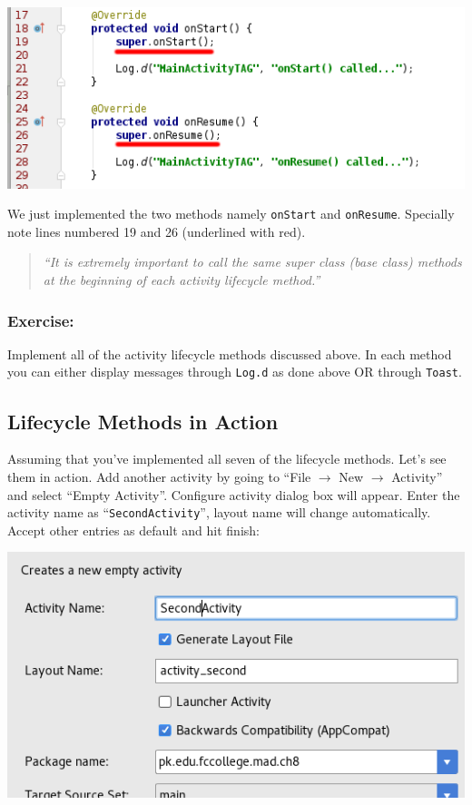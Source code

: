 \begin{center}
	\includegraphics[scale=0.4]{chapters/ch08/images/2}
\end{center}

We just implemented the two methods namely \texttt{onStart} and \texttt{onResume}. Specially note lines numbered 19 and 26 (underlined with red). 

\begin{quote}
	\textit{``It is extremely important to call the same super class (base class) methods at the beginning of each activity lifecycle method.''}
\end{quote}

\subsubsection{Exercise:}
Implement all of the activity lifecycle methods discussed above. In each method you can either display messages through \texttt{Log.d} as done above OR through \texttt{Toast}.

\subsection{Lifecycle Methods in Action}
Assuming that you've implemented all seven of the lifecycle methods. Let's see them in action. Add another activity by going to ``File $\rightarrow$ New $\rightarrow$ Activity'' and select ``Empty Activity''. Configure activity dialog box will appear. Enter the activity name as ``\texttt{SecondActivity}'', layout name will change automatically. Accept other entries as default and hit finish:

\begin{center}
	\includegraphics[scale=0.4]{chapters/ch08/images/3}
\end{center}

